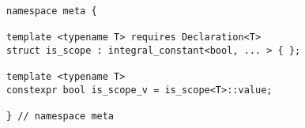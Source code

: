 
\begin{verbatim}
namespace meta {

template <typename T> requires Declaration<T>
struct is_scope : integral_constant<bool, ... > { };

template <typename T>
constexpr bool is_scope_v = is_scope<T>::value;

} // namespace meta
\end{verbatim}
